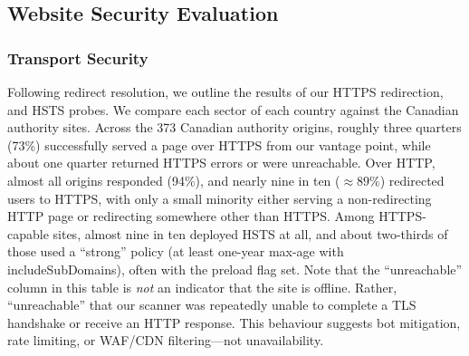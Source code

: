 \documentclass[pdflatex,sn-mathphys-num]{sn-jnl}
\newlength{\inlinecapskip}
\newenvironment{inlinecap}[1][\textwidth]
  {\par\vspace{\inlinecapskip}\noindent\begin{minipage}{#1}\centering}
  {\end{minipage}\par\vspace{\inlinecapskip}}
\numberwithin{equation}{section}
\theoremstyle{thmstyleone}
\theoremstyle{thmstyletwo}%
\theoremstyle{thmstylethree}%
\begin{document}
\subsection{Website Security Evaluation}

\subsubsection{Transport Security}

\vspace{1em}Following redirect resolution, we outline the results of our HTTPS redirection, and HSTS probes. 
We compare each sector of each country against the Canadian authority sites. Across the 
373 Canadian authority origins, roughly three quarters (73\%) successfully served a page over 
HTTPS from our vantage point, while about one quarter returned HTTPS errors or were unreachable. 
Over HTTP, almost all origins responded (94\%), and nearly nine in ten  ($\approx89\%$) 
redirected users to HTTPS, with only a small minority either serving a non-redirecting HTTP 
page or redirecting somewhere other than HTTPS. 
Among HTTPS-capable sites, almost nine in ten deployed HSTS at all, and about two-thirds of 
those used a ``strong'' policy (at least one-year max-age with includeSubDomains), 
often with the preload flag set. Note that the ``unreachable'' column in this table is \emph{not} 
an indicator that the site is offline. Rather, ``unreachable''  that
our scanner was repeatedly unable to complete a TLS handshake or receive an HTTP response. 
This behaviour suggests bot mitigation, rate limiting, or WAF/CDN filtering---not unavailability.

\begin{inlinecap}
\label{tab:https_connectivity}
\centering
\scriptsize
\setlength{\tabcolsep}{2.5pt}
%
\end{inlinecap}
\end{document}
